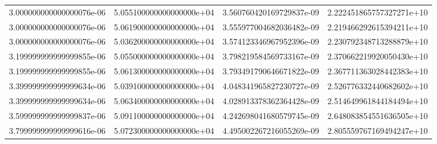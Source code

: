 \begin{table}
\begin{tabular}{S[scientific-notation=fixed,fixed-exponent = -6 ]@{\qquad} S[scientific-notation=fixed,fixed-exponent = 0, round-precision=0 ] S S[scientific-notation=fixed,fixed-exponent = 10 ]}
  3.000000000000000076e-06 & 5.055100000000000000e+04 & 3.560760420169729837e-09 & 2.222451865757327271e+10\\
  3.000000000000000076e-06 & 5.061900000000000000e+04 & 3.555977004682036482e-09 & 2.219466292615394211e+10\\
  3.000000000000000076e-06 & 5.036200000000000000e+04 & 3.574123346967952396e-09 & 2.230792348713288879e+10\\
  3.199999999999999855e-06 & 5.055000000000000000e+04 & 3.798219584569733167e-09 & 2.370662219920050430e+10\\
  3.199999999999999855e-06 & 5.061300000000000000e+04 & 3.793491790646671822e-09 & 2.367711363028442383e+10\\
  3.399999999999999634e-06 & 5.039100000000000000e+04 & 4.048341965827230727e-09 & 2.526776332440682602e+10\\
  3.399999999999999634e-06 & 5.063400000000000000e+04 & 4.028913378362364428e-09 & 2.514649961844184494e+10\\
  3.599999999999999837e-06 & 5.091100000000000000e+04 & 4.242698041680579745e-09 & 2.648083854551636505e+10\\
  3.799999999999999616e-06 & 5.072300000000000000e+04 & 4.495002267216055269e-09 & 2.805559767169494247e+10\\
  \bottomrule
\end{tabular}
\label{tab:e2}
\end{table}




















%

